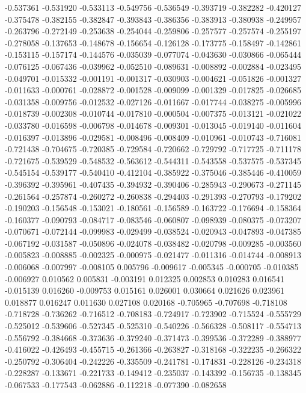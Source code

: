 -0.537361
-0.531920
-0.533113
-0.549756
-0.536549
-0.393719
-0.382282
-0.420127
-0.375478
-0.382155
-0.382847
-0.393843
-0.386356
-0.383913
-0.380938
-0.249957
-0.263796
-0.272149
-0.253638
-0.254044
-0.259806
-0.257577
-0.257574
-0.255197
-0.278058
-0.137653
-0.148678
-0.156654
-0.126128
-0.173775
-0.158497
-0.142861
-0.153115
-0.157174
-0.144576
-0.035039
-0.077074
-0.043630
-0.030866
-0.065444
-0.076125
-0.067436
-0.039962
-0.052510
-0.089631
-0.008892
-0.002884
-0.023495
-0.049701
-0.015332
-0.001191
-0.001317
-0.030903
-0.004621
-0.051826
-0.001327
-0.011633
-0.000761
-0.028872
-0.001528
-0.009099
-0.001329
-0.017825
-0.026685
-0.031358
-0.009756
-0.012532
-0.027126
-0.011667
-0.017744
-0.038275
-0.005996
-0.018739
-0.002308
-0.010744
-0.017810
-0.000504
-0.007375
-0.013121
-0.021022
-0.033780
-0.016598
-0.006798
-0.014678
-0.009301
-0.013045
-0.019140
-0.011604
-0.016397
-0.013896
-0.029581
-0.008496
-0.008409
-0.010961
-0.010743
-0.716081
-0.721438
-0.704675
-0.720385
-0.729584
-0.720662
-0.729792
-0.717725
-0.711178
-0.721675
-0.539529
-0.548532
-0.563612
-0.544311
-0.543558
-0.537575
-0.537345
-0.545154
-0.539177
-0.540410
-0.412104
-0.385922
-0.375046
-0.385446
-0.410059
-0.396392
-0.395961
-0.407435
-0.394932
-0.390406
-0.285943
-0.290673
-0.271145
-0.261564
-0.257874
-0.260272
-0.260838
-0.294403
-0.291393
-0.270793
-0.179202
-0.190203
-0.156548
-0.153021
-0.180561
-0.156589
-0.163722
-0.176694
-0.158364
-0.160377
-0.090793
-0.084717
-0.083546
-0.060807
-0.098939
-0.080375
-0.073207
-0.070671
-0.072144
-0.099983
-0.029499
-0.038524
-0.020943
-0.047893
-0.047385
-0.067192
-0.031587
-0.050896
-0.024078
-0.038482
-0.020798
-0.009285
-0.003560
-0.005823
-0.008885
-0.002325
-0.000975
-0.021477
-0.011316
-0.014744
-0.008913
-0.006068
-0.007997
-0.008105
0.005796
-0.009617
-0.005345
-0.000705
-0.010385
-0.006927
0.010562
0.005831
-0.003191
0.012325
0.002853
0.010283
0.016541
-0.015139
0.016260
-0.009753
0.015161
0.026001
0.030664
0.021626
0.023961
0.018877
0.016247
0.011630
0.027108
0.020168
-0.705965
-0.707698
-0.718108
-0.718728
-0.736262
-0.716512
-0.708183
-0.724917
-0.723902
-0.715524
-0.555729
-0.525012
-0.539606
-0.527345
-0.525310
-0.540226
-0.566328
-0.508117
-0.554713
-0.556792
-0.384668
-0.373636
-0.379240
-0.371473
-0.399536
-0.372289
-0.388977
-0.416022
-0.426493
-0.455715
-0.261366
-0.263827
-0.318168
-0.322235
-0.266322
-0.250792
-0.306404
-0.242226
-0.335509
-0.241781
-0.174831
-0.228126
-0.234318
-0.228287
-0.133671
-0.221733
-0.149412
-0.235037
-0.143392
-0.156735
-0.138345
-0.067533
-0.177543
-0.062886
-0.112218
-0.077390
-0.082658
